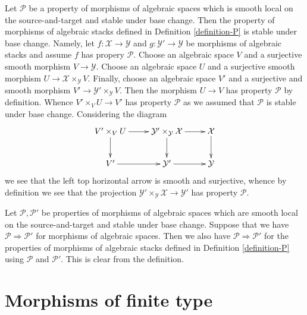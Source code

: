 \begin{remark}
\label{remark-base-change}
Let $\mathcal{P}$ be a property of morphisms of algebraic spaces
which is smooth local on the source-and-target and stable under base change.
Then the property of morphisms of algebraic stacks defined in
Definition \ref{definition-P}
is stable under base change. Namely, let $f : \mathcal{X} \to \mathcal{Y}$
and $g : \mathcal{Y}' \to \mathcal{Y}$ be morphisms of algebraic stacks
and assume $f$ has propery $\mathcal{P}$. Choose an algebraic space $V$
and a surjective smooth morphism $V \to \mathcal{Y}$. Choose an algebraic
space $U$ and a surjective smooth morphism
$U \to \mathcal{X} \times_\mathcal{Y} V$. Finally, choose an algebraic space
$V'$ and a surjective and smooth morphism
$V' \to \mathcal{Y}' \times_\mathcal{Y} V$. Then the morphism
$U \to V$ has property $\mathcal{P}$ by definition.
Whence $V' \times_V U \to V'$ has property $\mathcal{P}$ as we assumed that
$\mathcal{P}$ is stable under base change. Considering the diagram
$$
\xymatrix{
V' \times_V U \ar[r] \ar[d] &
\mathcal{Y}' \times_\mathcal{Y} \mathcal{X} \ar[r] \ar[d] &
\mathcal{X} \ar[d] \\
V' \ar[r] & \mathcal{Y}' \ar[r] & \mathcal{Y}
}
$$
we see that the left top horizontal arrow is smooth and surjective,
whence by definition we see that the projection
$\mathcal{Y}' \times_\mathcal{Y} \mathcal{X} \to \mathcal{Y}'$ has
property $\mathcal{P}$.
\end{remark}

\begin{remark}
\label{remark-implication}
Let $\mathcal{P}, \mathcal{P}'$ be properties of morphisms of algebraic spaces
which are smooth local on the source-and-target and stable under base change.
Suppose that we have $\mathcal{P} \Rightarrow \mathcal{P}'$ for morphisms
of algebraic spaces. Then we also have $\mathcal{P} \Rightarrow \mathcal{P}'$
for the properties of morphisms of algebraic stacks defined in
Definition \ref{definition-P}
using $\mathcal{P}$ and $\mathcal{P}'$. This is clear from the definition.
\end{remark}









\section{Morphisms of finite type}
\label{section-finite-type}

